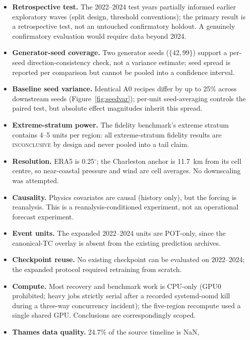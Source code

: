 \begin{itemize}
    \item \textbf{Retrospective test.} The 2022--2024 test years partially
    informed earlier exploratory waves (split design, threshold conventions);
    the primary result is a retrospective test, not an untouched confirmatory
    holdout. A genuinely confirmatory evaluation would require data beyond
    2024.
    \item \textbf{Generator-seed coverage.} Two generator seeds
    ($\{42, 99\}$) support a per-seed direction-consistency check, not a
    variance estimate; seed spread is reported per comparison but cannot be
    pooled into a confidence interval.
    \item \textbf{Baseline seed variance.} Identical A0 recipes differ by up
    to 25\% across downstream seeds (Figure~\ref{fig:seedvar}); per-unit
    seed-averaging controls the paired test, but absolute effect magnitudes
    inherit this spread.
    \item \textbf{Extreme-stratum power.} The fidelity benchmark's extreme
    stratum contains 4--5 units per region: all extreme-stratum fidelity
    results are \textsc{inconclusive} by design and never pooled into a tail
    claim.
    \item \textbf{Resolution.} ERA5 is 0.25$^\circ$; the Charleston anchor is
    11.7~km from its cell centre, so near-coastal pressure and wind are cell
    averages. No downscaling was attempted.
    \item \textbf{Causality.} Physics covariates are causal (history only), but
    the forcing is reanalysis. This is a reanalysis-conditioned experiment, not
    an operational forecast experiment.
    \item \textbf{Event units.} The expanded 2022--2024 units are POT-only, since
    the canonical-TC overlay is absent from the existing prediction archives.
    \item \textbf{Checkpoint reuse.} No existing checkpoint can be evaluated on
    2022--2024; the expanded protocol required retraining from scratch.
    \item \textbf{Compute.} Most recovery and benchmark work is CPU-only
    (GPU0 prohibited; heavy jobs strictly serial after a recorded
    systemd-oomd kill during a three-way concurrency incident); the
    five-region recompute used a single shared GPU. Conclusions are
    correspondingly scoped.
    \item \textbf{Thames data quality.} 24.7\% of the source timeline is NaN,

\end{itemize}

